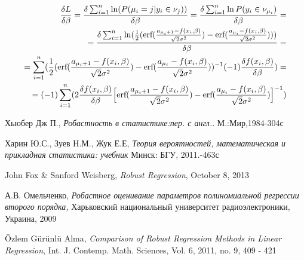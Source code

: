 \documentclass[12pt]{article}
\begin{document}
\begin{eqnarray}
    \frac{\delta L}{\delta \beta}=\frac{\delta \sum_{i=1}^{n}\ln(P(\mu_i=j|y_i\in \nu_j))}{\delta \beta}=\frac{\delta \sum_{i=1}^{n}\ln P(y_i\in \nu_{\mu_i})}{\delta \beta}=\\
    =\frac{\delta \sum_{i=1}^{n} \ln(\frac{1}{2}(\textup{erf}(\frac{a_{\mu_i+1}-f(x_i,\beta)}{\sqrt{2}\sigma^2})-\textup{erf}(\frac{a_{\mu_i}-f(x_i,\beta)}{\sqrt{2}\sigma^2})) )         }{\delta \beta}=\\
    =  \sum_{i=1}^{n} (\frac{1}{2}(\textup{erf}(\frac{a_{\mu_i+1}-f(x_i,\beta)}{\sqrt{2}\sigma^2})-\textup{erf}(\frac{a_{\mu_i}-f(x_i,\beta)}{\sqrt{2}\sigma^2}))^{-1}(-1) \frac{\delta f(x_i,\beta)}{\delta \beta} )= \\
    = (-1) \sum_{i=1}^{n} (2\frac{\delta f(x_i,\beta)}{\delta \beta}\Big[ \textup{erf}(\frac{a_{\mu_i+1}-f(x_i,\beta)}{\sqrt{2}\sigma^2})-\textup{erf}(\frac{a_{\mu_i}-f(x_i,\beta)}{\sqrt{2}\sigma^2})\Big]^{-1})
\end{eqnarray}
\begin{thebibliography}{9}
    Хьюбер Дж П.,
    \textit{Робастность в статистике:пер. с англ.}.
    М.:Мир,1984-304с

    Харин Ю.С., Зуев Н.М.,
    Жук Е.Е,
    \textit{Теория вероятностей, математическая и прикладная статистика: учебник}
    Минск: БГУ, 2011.-463с

    John Fox \& Sanford Weisberg,
    \textit{Robust Regression},
    October 8, 2013

    А.В. Омельченко,
    \textit{Робастное оценивание параметров полиномиальной регрессии второго порядка,}
    Харьковский национальный университет радиоэлектроники, Украина, 2009

    \"{O}zlem G\"{u}r\"{u}nl\"{u} Alma,
    \textit{Comparison of Robust Regression Methods
    in Linear Regression},
    Int. J. Contemp. Math. Sciences, Vol. 6, 2011, no. 9, 409 - 421
\end{thebibliography}
\end{document}
